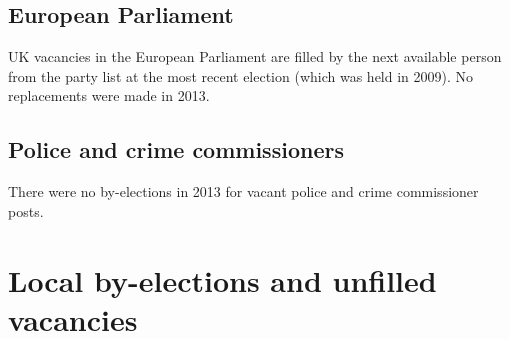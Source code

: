 \section{European Parliament}

UK vacancies in the European Parliament are filled by the next available person from the party list at the most recent election (which was held in 2009). 
No replacements were made in 2013.


\section{Police and crime commissioners}

There were no by-elections in 2013 for vacant police and crime commissioner posts.

\chapter{Local by-elections and unfilled vacancies}

